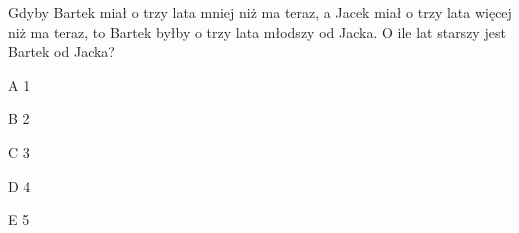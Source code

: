 \begin{tresc}
Gdyby Bartek miał o trzy lata mniej niż ma teraz, a Jacek miał o trzy lata więcej niż ma teraz, to Bartek byłby o trzy lata młodszy od Jacka. O ile lat starszy jest Bartek od Jacka?
\end{tresc}
\begin{wariant}{A} 1 \end{wariant}
\begin{wariant}{B} 2 \end{wariant}
\begin{wariant}{C} 3 \end{wariant}
\begin{wariant}{D} 4 \end{wariant}
\begin{wariant}{E} 5 \end{wariant}
